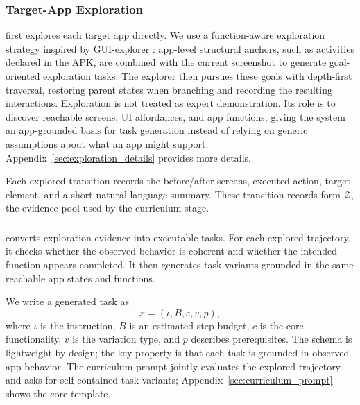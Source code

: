 

\subsubsection{Target-App Exploration}

\ourmethod first explores each target app directly. We use a function-aware exploration strategy inspired by GUI-explorer \citep{xie2025gui}: app-level structural anchors, such as activities declared in the APK, are combined with the current screenshot to generate goal-oriented exploration tasks. The explorer then pursues these goals with depth-first traversal, restoring parent states when branching and recording the resulting interactions. Exploration is not treated as expert demonstration. Its role is to discover reachable screens, UI affordances, and app functions, giving the system an app-grounded basis for task generation instead of relying on generic assumptions about what an app might support. Appendix~\ref{sec:exploration_details} provides more details.

Each explored transition records the before/after screens, executed action, target element, and a short natural-language summary. These transition records form $\mathcal{Z}$, the evidence pool used by the curriculum stage.

\subsubsection{\curriculum}
\label{sec:curriculum}

\curriculum converts exploration evidence into executable tasks. For each explored trajectory, it checks whether the observed behavior is coherent and whether the intended function appears completed. It then generates task variants grounded in the same reachable app states and functions.

We write a generated task as
\begin{equation}
    x=(\iota,B,c,v,p),
\end{equation}
where $\iota$ is the instruction, $B$ is an estimated step budget, $c$ is the core functionality, $v$ is the variation type, and $p$ describes prerequisites. The schema is lightweight by design; the key property is that each task is grounded in observed app behavior.
The curriculum prompt jointly evaluates the explored trajectory and asks for self-contained task variants; Appendix~\ref{sec:curriculum_prompt} shows the core template.

